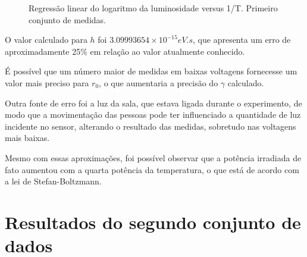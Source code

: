 \documentclass[brazilian,12pt,a4paper,final]{article}
\begin{document}
\begin{figure}[htbp!]
  \caption{Regressão linear do logaritmo da luminosidade versus 1/T. Primeiro conjunto de medidas.}
  \label{fighum}
  \centering
\end{figure}

O valor calculado para $h$ foi $3.09993654 \times 10^{-15} eV.s$, que apresenta
um erro de aproximadamente 25\% em relação ao valor atualmente conhecido.

É possível que um número maior de medidas em baixas voltagens fornecesse
um valor mais preciso para $r_0$, o que aumentaria a precisão do $\gamma$
calculado.

Outra fonte de erro foi a luz da sala, que estava ligada durante o 
experimento, de modo que a movimentação das pessoas pode ter influenciado
a quantidade de luz incidente no sensor, 
alterando o resultado das medidas, sobretudo nas voltagens mais baixas.

Mesmo com essas aproximações, 
foi possível observar que a potência irradiada de fato aumentou
com a quarta potência da temperatura, 
o que está de acordo com a lei de Stefan-Boltzmann.

\section{Resultados do segundo conjunto de dados}
\end{document}
